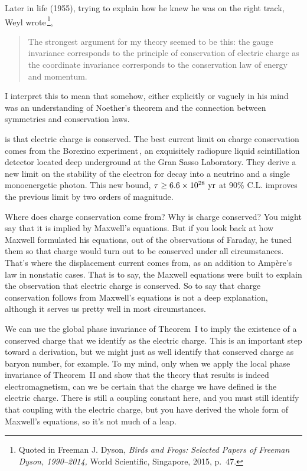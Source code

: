 \documentclass[twoside,symmetric]{tufte-handout}
\begin{document}
Later in life (1955), trying to explain how he knew he was on the right track, Weyl wrote$\,$\footnote{Quoted in Freeman J. Dyson, \emph{Birds and Frogs: Selected Papers of Freeman Dyson, 1990--2014,} World Scientific, Singapore, 2015, p.~47.},
\begin{quote}
The strongest argument for my theory seemed to be this: the gauge invariance corresponds to the principle of conservation of electric charge as the coordinate invariance corresponds to the conservation law of energy and momentum.
\end{quote}
I interpret this to mean that somehow, either explicitly or vaguely in his mind was an understanding of Noether's theorem and the connection between symmetries and conservation laws.

 is that electric charge is conserved. The best current limit on charge conservation comes from the Borexino experiment$\,$\cite{Agostini:2015oze}, an exquisitely radiopure liquid scintillation detector  located deep underground at the Gran Sasso Laboratory. They derive a new limit on the stability of the electron for decay into a neutrino and a single monoenergetic photon. This new bound, $\tau \ge 6.6 \times 10^{28}\hbox{ yr}$ at 90\% C.L. improves the previous limit by two orders of magnitude.

Where does charge conservation come from? Why is charge conserved? You might say that it is implied by Maxwell's equations. But if you look back at how Maxwell formulated his equations, out of the observations of Faraday, he tuned them so that charge would turn out to be conserved under all circumstances. That's where the displacement current comes from, as an addition to Ampère's law in nonstatic cases. That is to say, the Maxwell equations were built to explain the observation that electric charge is conserved. So to say that charge conservation follows from Maxwell's equations is not a deep explanation, although it serves us pretty well in most circumstances.

We can use the global phase invariance of Theorem~I to imply the existence of a conserved charge that we identify as the electric charge. This is an important step toward a derivation, but we might just as well identify that conserved charge as baryon number, for example. To my mind, only when we apply the local phase invariance of Theorem~II and show that the theory that results is indeed electromagnetism, can we be certain that the charge we have defined is the electric charge. There is still a coupling constant here, and you must still identify that coupling with the electric charge, but you have derived the whole form of Maxwell's equations, so it's not much of a leap.
\end{document}
